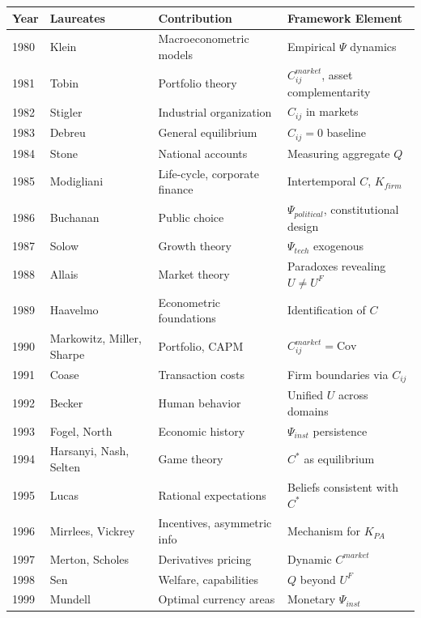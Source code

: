 \documentclass[12pt,a4paper]{article}
\begin{document}
\begin{center}
\renewcommand{\arraystretch}{1.15}
\small
\begin{tabular}{llll}
\hline
\textbf{Year} & \textbf{Laureates} & \textbf{Contribution} & \textbf{Framework Element} \\
\hline
1980 & Klein & Macroeconometric models & Empirical $\Psi$ dynamics \\
1981 & Tobin & Portfolio theory & $C^{market}_{ij}$, asset complementarity \\
1982 & Stigler & Industrial organization & $C_{ij}$ in markets \\
1983 & Debreu & General equilibrium & $C_{ij} = 0$ baseline \\
1984 & Stone & National accounts & Measuring aggregate $Q$ \\
1985 & Modigliani & Life-cycle, corporate finance & Intertemporal $C$, $K_{firm}$ \\
1986 & Buchanan & Public choice & $\Psi_{political}$, constitutional design \\
1987 & Solow & Growth theory & $\Psi_{tech}$ exogenous \\
1988 & Allais & Market theory & Paradoxes revealing $U \neq U^F$ \\
1989 & Haavelmo & Econometric foundations & Identification of $C$ \\
1990 & Markowitz, Miller, Sharpe & Portfolio, CAPM & $C^{market}_{ij} = \text{Cov}$ \\
1991 & Coase & Transaction costs & Firm boundaries via $C_{ij}$ \\
1992 & Becker & Human behavior & Unified $U$ across domains \\
1993 & Fogel, North & Economic history & $\Psi_{inst}$ persistence \\
1994 & Harsanyi, Nash, Selten & Game theory & $C^*$ as equilibrium \\
1995 & Lucas & Rational expectations & Beliefs consistent with $C^*$ \\
1996 & Mirrlees, Vickrey & Incentives, asymmetric info & Mechanism for $K_{PA}$ \\
1997 & Merton, Scholes & Derivatives pricing & Dynamic $C^{market}$ \\
1998 & Sen & Welfare, capabilities & $Q$ beyond $U^F$ \\
1999 & Mundell & Optimal currency areas & Monetary $\Psi_{inst}$ \\
\hline
\end{tabular}
\end{center}
\end{document}
